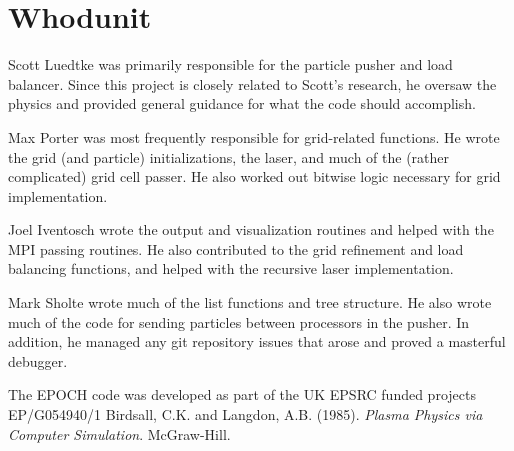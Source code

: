 \documentclass[]{article}
\begin{document}
\section{Whodunit}
Scott Luedtke was primarily responsible for the particle pusher and load balancer.  Since this project is closely related to Scott's research, he oversaw the physics and provided general guidance for what the code should accomplish.

Max Porter was most frequently responsible for grid-related functions. He wrote the grid (and particle) initializations, the laser, and much of the (rather complicated) grid cell passer. He also worked out bitwise logic necessary for grid implementation.

Joel Iventosch wrote the output and visualization routines and helped with the MPI passing routines.  He also contributed to the grid refinement and load balancing functions, and helped with the recursive laser implementation.

Mark Sholte wrote much of the list functions and tree structure.  He also wrote much of the code for sending particles between processors in the pusher. In addition, he managed any git repository issues that arose and proved a masterful debugger.



{\def\section*#1{}
\begin{thebibliography}{1}
\setlength{\itemsep}{0pt}
The EPOCH code was developed as part of the UK EPSRC funded projects EP/G054940/1
Birdsall, C.K. and Langdon, A.B.  (1985). \textit{Plasma Physics via Computer Simulation}. McGraw-Hill.

\end{thebibliography}
}
\end{document}
